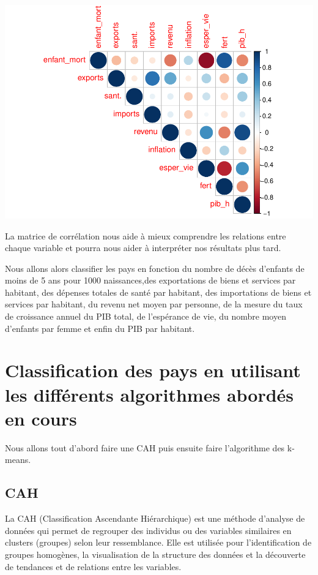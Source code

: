 \documentclass[
]{article}
\begin{document}
\includegraphics{Projet_files/figure-latex/unnamed-chunk-10-1.pdf}

La matrice de corrélation nous aide à mieux comprendre les relations
entre chaque variable et pourra nous aider à interpréter nos résultats
plus tard.

Nous allons alors classifier les pays en fonction du nombre de décès
d'enfants de moins de 5 ans pour 1000 naissances,des exportations de
biens et services par habitant, des dépenses totales de santé par
habitant, des importations de biens et services par habitant, du revenu
net moyen par personne, de la mesure du taux de croissance annuel du PIB
total, de l'espérance de vie, du nombre moyen d'enfants par femme et
enfin du PIB par habitant.

\hypertarget{classification-des-pays-en-utilisant-les-diffuxe9rents-algorithmes-aborduxe9s-en-cours}{%
\section{Classification des pays en utilisant les différents algorithmes
abordés en
cours}\label{classification-des-pays-en-utilisant-les-diffuxe9rents-algorithmes-aborduxe9s-en-cours}}

Nous allons tout d'abord faire une CAH puis ensuite faire l'algorithme
des k-means.

\hypertarget{cah}{%
\subsection{CAH}\label{cah}}

La CAH (Classification Ascendante Hiérarchique) est une méthode
d'analyse de données qui permet de regrouper des individus ou des
variables similaires en clusters (groupes) selon leur ressemblance. Elle
est utilisée pour l'identification de groupes homogènes, la
visualisation de la structure des données et la découverte de tendances
et de relations entre les variables.
\end{document}
